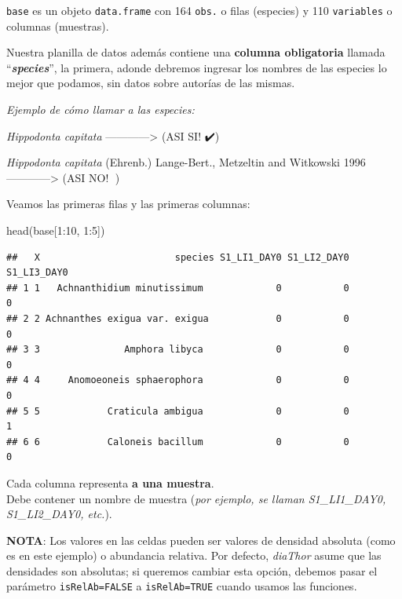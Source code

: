 \documentclass[
]{book}
\newenvironment{Shaded}{\begin{snugshade}}{\end{snugshade}}
\newcommand{\DecValTok}[1]{\textcolor[rgb]{0.00,0.00,0.81}{#1}}
\newcommand{\FunctionTok}[1]{\textcolor[rgb]{0.00,0.00,0.00}{#1}}
\newcommand{\NormalTok}[1]{#1}
\newcommand{\SpecialCharTok}[1]{\textcolor[rgb]{0.00,0.00,0.00}{#1}}
\begin{document}
\texttt{base} es un objeto \texttt{data.frame} con 164 \texttt{obs.} o filas (especies) y 110 \texttt{variables} o columnas (muestras).

Nuestra planilla de datos además contiene una \textbf{columna obligatoria} llamada ``\textbf{\emph{species}}'', la primera, adonde debremos ingresar los nombres de las especies lo mejor que podamos, sin datos sobre autorías de las mismas.

\emph{Ejemplo de cómo llamar a las especies:}

\emph{Hippodonta capitata} ------------\textgreater{} (ASI SI! ✔️)

\emph{Hippodonta capitata} (Ehrenb.) Lange-Bert., Metzeltin and Witkowski 1996 ------------\textgreater{} (ASI NO! 🚫)

Veamos las primeras filas y las primeras columnas:

\begin{Shaded}
\begin{Highlighting}[]
\FunctionTok{head}\NormalTok{(base[}\DecValTok{1}\SpecialCharTok{:}\DecValTok{10}\NormalTok{, }\DecValTok{1}\SpecialCharTok{:}\DecValTok{5}\NormalTok{])}
\end{Highlighting}
\end{Shaded}

\begin{verbatim}
##   X                        species S1_LI1_DAY0 S1_LI2_DAY0 S1_LI3_DAY0
## 1 1   Achnanthidium minutissimum             0           0           0
## 2 2 Achnanthes exigua var. exigua            0           0           0
## 3 3               Amphora libyca             0           0           0
## 4 4     Anomoeoneis sphaerophora             0           0           0
## 5 5            Craticula ambigua             0           0           1
## 6 6            Caloneis bacillum             0           0           0
\end{verbatim}

Cada columna representa \textbf{a una muestra}.\\
Debe contener un nombre de muestra (\emph{por ejemplo, se llaman S1\_LI1\_DAY0, S1\_LI2\_DAY0, etc.}).

\textbf{NOTA}: Los valores en las celdas pueden ser valores de densidad absoluta (como es en este ejemplo) o abundancia relativa. Por defecto, \emph{diaThor} asume que las densidades son absolutas; si queremos cambiar esta opción, debemos pasar el parámetro \texttt{isRelAb=FALSE} a \texttt{isRelAb=TRUE} cuando usamos las funciones.
\end{document}
